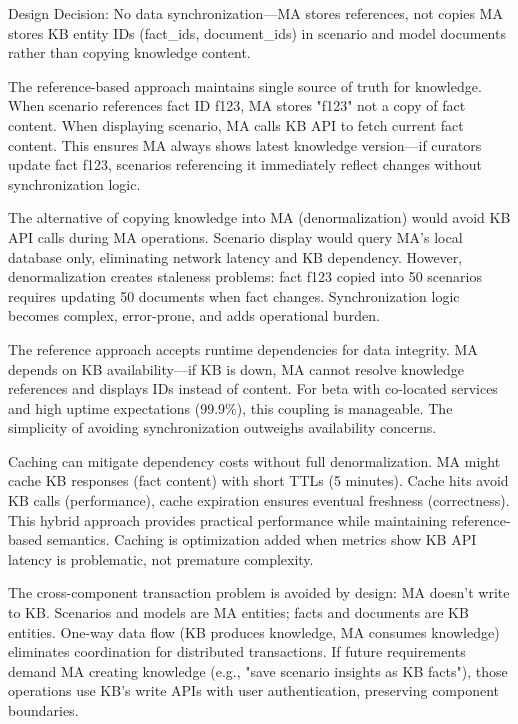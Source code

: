 \documentclass[12pt,a4paper]{article}
\begin{document}
\begin{rationale}{Design Decision: No data synchronization—MA stores references, not copies}
MA stores KB entity IDs (fact\_ids, document\_ids) in scenario and model documents rather than copying knowledge content.
\end{rationale}

The reference-based approach maintains single source of truth for knowledge. When scenario references fact ID f123, MA stores "f123" not a copy of fact content. When displaying scenario, MA calls KB API to fetch current fact content. This ensures MA always shows latest knowledge version—if curators update fact f123, scenarios referencing it immediately reflect changes without synchronization logic.

The alternative of copying knowledge into MA (denormalization) would avoid KB API calls during MA operations. Scenario display would query MA's local database only, eliminating network latency and KB dependency. However, denormalization creates staleness problems: fact f123 copied into 50 scenarios requires updating 50 documents when fact changes. Synchronization logic becomes complex, error-prone, and adds operational burden.

The reference approach accepts runtime dependencies for data integrity. MA depends on KB availability—if KB is down, MA cannot resolve knowledge references and displays IDs instead of content. For beta with co-located services and high uptime expectations (99.9\%), this coupling is manageable. The simplicity of avoiding synchronization outweighs availability concerns.

Caching can mitigate dependency costs without full denormalization. MA might cache KB responses (fact content) with short TTLs (5 minutes). Cache hits avoid KB calls (performance), cache expiration ensures eventual freshness (correctness). This hybrid approach provides practical performance while maintaining reference-based semantics. Caching is optimization added when metrics show KB API latency is problematic, not premature complexity.

The cross-component transaction problem is avoided by design: MA doesn't write to KB. Scenarios and models are MA entities; facts and documents are KB entities. One-way data flow (KB produces knowledge, MA consumes knowledge) eliminates coordination for distributed transactions. If future requirements demand MA creating knowledge (e.g., "save scenario insights as KB facts"), those operations use KB's write APIs with user authentication, preserving component boundaries.
\end{document}
